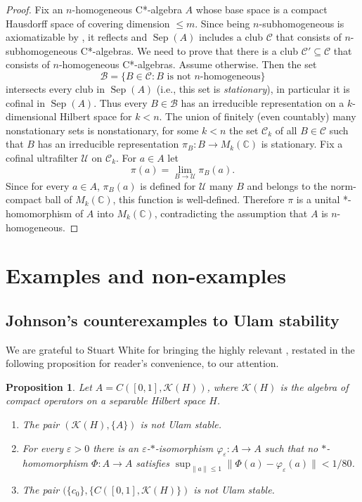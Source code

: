 \documentclass[11pt]{amsproc}
\DeclareMathOperator{\Sep}{Sep}
\newcommand{\cstar}{C*}
\newcommand{\cC}{\mathcal C}
\newcommand{\cB}{\mathcal B}
\newcommand{\bbC}{\mathbb C}
\newcommand{\cU}{\mathcal U}
\newcommand{\cK}{\mathcal K}
\theoremstyle{definition}
\theoremstyle{plain}
\newtheorem{proposition}[definition]{Proposition}
\theoremstyle{remark}
\begin{document}
\begin{proof} Fix an $n$-homogeneous \cstar-algebra $A$ whose base space is a compact Hausdorff space of covering dimension $\leq m$. Since being $n$-subhomogeneous is axiomatizable by \cite[Theorem~2.5.1]{Muenster}, it reflects and  $\Sep(A)$ includes a club $\cC$ that consists of $n$-subhomogeneous \cstar-algebras. We need to prove that there is a club $\cC'\subseteq \cC$ that consists of $n$-homogeneous \cstar-algebras. Assume otherwise. Then  the set 
	\[
	\cB=\{B\in \cC: B\text{ is not $n$-homogeneous}\}
	\] 
	intersects every club in $\Sep(A)$ (i.e., this set is \emph{stationary}), in particular it is cofinal in $\Sep(A)$.  Thus every $B\in \cB$ has an irreducible representation on a $k$-dimensional Hilbert space for $k<n$. The union of finitely (even countably) many nonstationary sets is nonstationary, for some $k<n$ the set $\cC_k$ of all $B\in \cC$ such that $B$ has an irreducible representation $\pi_B\colon B\to M_k(\bbC)$ is stationary. Fix a cofinal ultrafilter $\cU$ on $\cC_k$. For $a\in A$ let 
	\[
	\pi(a)=\lim_{B\to \cU} \pi_B(a). 
	\]
Since for every $a\in A$, $\pi_B(a)$ is defined for $\cU$ many $B$ and belongs to the norm-compact ball of $M_k(\bbC)$, this function is well-defined.  Therefore $\pi$ is a unital *-homomorphism of $A$ into $M_k(\bbC)$, contradicting the assumption that $A$ is $n$-homogeneous.  
\end{proof}


\section{Examples and non-examples}

\subsection{Johnson's counterexamples to Ulam stability}
\label{S.Johnson}


We are grateful to Stuart White for bringing the highly relevant  \cite[Theorem~3 and Corollary~4]{johnson1982counterexample}, restated in the following proposition for reader's convenience,  to our attention. 


\begin{proposition}\label{P.Counterexample} 
Let $A=C([0,1],\cK(H))$, where $\cK(H)$ is the algebra of compact operators on a separable Hilbert space $H$. 
	\begin{enumerate}
		\item \label{1.Counterexample} The pair $(\cK(H), \{A\})$  is not Ulam stable. 
		\item \label{3.Counterexample} For every $\varepsilon>0$ there is an $\varepsilon$-$*$-isomorphism $\varphi_\varepsilon\colon A\to A$ such that no $*$-ho\-mo\-mor\-phism $\Phi\colon A\to A$ satisfies $\sup_{\|a\|\leq 1} \|\Phi(a)-\varphi_\varepsilon(a)\|<1/80$. 
		\item 	\label{2.Counterexample} The pair $(\{c_0\}, \{C([0,1],\cK(H)\})$  is not Ulam stable. 
	\end{enumerate}
	\end{proposition}
\end{document}
